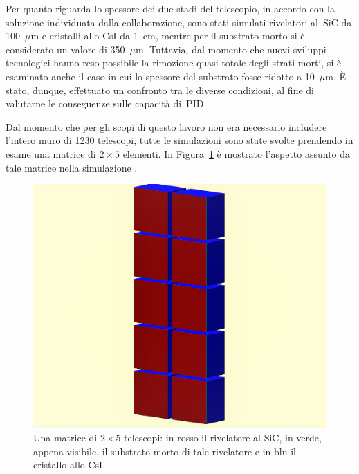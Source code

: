 Per quanto riguarda lo spessore dei due stadi del telescopio, in accordo con la soluzione individuata dalla collaborazione, sono stati simulati rivelatori al~SiC da 100~$\mu$m e cristalli allo CsI da 1~cm, mentre per il substrato morto si è considerato un valore di 350~$\mu$m.
Tuttavia, dal momento che nuovi sviluppi tecnologici hanno reso possibile la rimozione quasi totale degli strati morti, si è esaminato anche il caso in cui lo spessore del substrato fosse ridotto a 10~$\mu$m. 
È stato, dunque, effettuato un confronto tra le diverse condizioni, al fine di valutarne le conseguenze sulle capacità di~PID.





Dal momento che per gli scopi di questo lavoro non era necessario includere l'intero muro di 1230 telescopi, tutte le simulazioni sono state svolte prendendo in esame una matrice di $2 \times 5$ elementi.
In Figura~\ref{fig:simulazione_muro} è mostrato l'aspetto assunto da tale matrice nella simulazione \geant. 

\begin{figure} [!p]
	\centering
	\includegraphics[width=\textwidth, keepaspectratio]{Grafici/modulo2_ritagliato.png}
	\caption{Una matrice di $2 \times 5$ telescopi: in rosso il rivelatore al SiC, in verde, appena visibile, il substrato morto di tale rivelatore e in blu il cristallo allo CsI.} \label{fig:simulazione_muro}
\end{figure}


